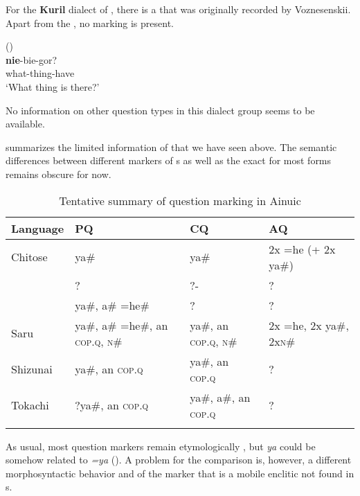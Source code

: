 For the \textbf{Kuril} dialect of , there is a  that was originally recorded by Voznesenskii. Apart from the , no marking is present.

\ea%
    \label{ex:ainu:21}
     ()\\
    \gll \textbf{{nie}}{-bie-gor?}\\
    what-thing-have\\
    \glt ‘What thing is there?’ \citep[199]{Vovin1993}
    \z

\noindent No information on other question types in this dialect group seems to be available.

 summarizes the limited information of   that we have seen above. The semantic differences between different markers of s as well as the exact  for most forms remains obscure for now.

\begin{table}
\caption{Tentative summary of question marking in Ainuic}
\label{tab:ainu:1}
\small
\begin{tabularx}{\textwidth}{Qlll}
\lsptoprule 
\textbf{Language} & \textbf{PQ} & \textbf{CQ} & \textbf{AQ}\\
\midrule 
Chitose  & ya\# & ya\# & 2x =he (+ 2x ya\#)\\
  & ? & ?- & ?\\
  & ya\#, a\# =he\# & ? & ?\\
Saru  & ya\#, a\# =he\#, an \textsc{cop.q}, \textsc{n\#} & ya\#, an \textsc{cop.q}, \textsc{n\#} & 2x =he, 2x ya\#, 2x\textsc{n\#}\\
Shizunai  & ya\#, an \textsc{cop.q} & ya\#, an \textsc{cop.q} & ?\\
Tokachi  & ?ya\#, an \textsc{cop.q} & ya\#, a\#, an \textsc{cop.q} & ?\\
\lspbottomrule
\end{tabularx}
\end{table}

As usual, most question markers remain etymologically , but  \textit{ya} could be somehow related to  \textit{=ya} (). A problem for the comparison is, however, a different morphosyntactic behavior and  of the  marker that is a mobile enclitic not found in s.

